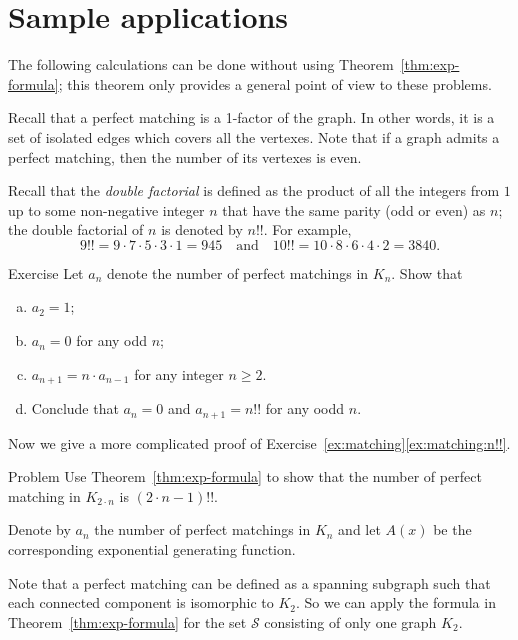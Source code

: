 \section*{Sample applications}

The following calculations can be done without using Theorem~\ref{thm:exp-formula};
this theorem only provides a general point of view to these problems.

Recall that a perfect matching is a 1-factor of the graph. 
In other words, it is a set of isolated edges which covers all the vertexes.
Note that if a graph admits a perfect matching, then the number of its vertexes is even.

Recall that the \emph{double factorial} is defined as the product of all the integers from $1$ up to some non-negative integer $n$ that have the same parity (odd or even) as $n$;
the double factorial of $n$ is denoted by $n!!$.
For example, 
\[9!! = 9\cdot 7 \cdot 5 \cdot 3 \cdot  1 = 945
\quad\text{and}\quad
10!!=10\cdot8\cdot6\cdot4\cdot2=3840.
\]

\begin{thm}{Exercise}\label{ex:matching}
Let $a_n$ denote the number of perfect matchings in $K_n$.
Show that 
\begin{enumerate}[(a)]
 \item $a_2=1$;
 \item $a_n=0$ for any odd $n$;
 \item\label{ex:matching:recursion} $a_{n+1}=n\cdot a_{n-1}$ for any integer $n\ge 2$.
 \item\label{ex:matching:n!!} 
 Conclude that $a_n=0$ and $a_{n+1}=n!!$ for any oodd $n$.
\end{enumerate}

\end{thm}

Now we give a more complicated proof of Exercise~\ref{ex:matching}\ref{ex:matching:n!!}.

\begin{thm}{Problem}
Use Theorem~\ref{thm:exp-formula} to show that the number of perfect matching in $K_{2\cdot n}$ is $(2\cdot n-1)!!$.
\end{thm}

Denote by $a_n$ the number of perfect matchings in $K_{n}$ and let $A(x)$ be the corresponding exponential generating function.

Note that a perfect matching can be defined as a spanning subgraph such that each connected component is isomorphic to $K_2$.
So we can apply the formula in Theorem~\ref{thm:exp-formula} for the set $\mathcal{S}$ consisting of only one graph $K_2$.

